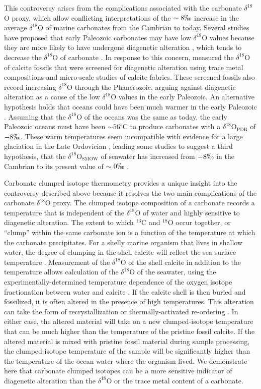 \documentclass{article}
\newcommand{\deltao}{$\delta^{18}$}
\newcommand{\degrees}{$^{\circ}$}
\begin{document}
This controversy arises from the complications associated with the carbonate \deltao O proxy, which allow conflicting interpretations of the $\sim 8\permil$ increase in the average \deltao O of marine carbonates from the Cambrian to today. Several studies have proposed that early Paleozoic carbonates may have low \deltao O values because they are more likely to have undergone diagenetic alteration \citep{Clayton1959,Keith1964,Land1995}, which tends to decrease the \deltao O of carbonate \citep{Marshall1992}. In response to this concern, \cite{Veizer1999} measured the \deltao O of calcite fossils that were screened for diagenetic alteration using trace metal compositions and micro-scale studies of calcite fabrics. These screened fossils also record increasing \deltao O through the Phanerozoic, arguing against diagenetic alteration as a cause of the low \deltao O values in the early Paleozoic. An alternative hypothesis holds that oceans could have been much warmer in the early Paleozoic \citep{Karhu1986,Knauth1976}. Assuming that the \deltao O of the oceans was the same as today, the early Paleozoic oceans must have been $\sim 56$\degrees C to produce carbonates with a \deltao O$_{\text{PDB}}$ of $-8\permil$. These warm temperatures seem incompatible with evidence for a large glaciation in the Late Ordovician \citep{Veizer1986}, leading some studies to suggest a third hypothesis, that the \deltao O$_{\text{SMOW}}$ of seawater has increased from $-8\permil$ in the Cambrian to its present value of $\sim 0\permil$ \citep{Jaffres2007,Veizer1999}. 

Carbonate clumped isotope thermometry provides a unique insight into the controversy described above because it resolves the two main complications of the carbonate \deltao O proxy. The clumped isotope composition of a carbonate records a temperature that is independent of the \deltao O of water and highly sensitive to diagenetic alteration. The extent to which $^{13}$C and $^{18}$O occur together, or ``clump'' within the same carbonate ion is a function of the temperature at which the carbonate precipitates. For a shelly marine organism that lives in shallow water, the degree of clumping in the shell calcite will reflect the sea surface temperature \citep{Ghosh2006}. Measurement of the \deltao O of the shell calcite in addition to the temperature allows calculation of the \deltao O of the seawater, using the experimentally-determined temperature dependence of the oxygen isotope fractionation between water and calcite \citep{Kim1997}. If the calcite shell is then buried and fossilized, it is often altered in the presence of high temperatures. This alteration can take the form of recrystallization or thermally-activated re-ordering \citep{Eiler2011}. In either case, the altered material will take on a new clumped-isotope temperature that can be much higher than the temperature of the pristine fossil calcite. If the altered material is mixed with pristine fossil material during sample processing, the clumped isotope temperature of the sample will be significantly higher than the temperature of the ocean water where the organism lived. We demonstrate here that carbonate clumped isotopes can be a more sensitive indicator of diagenetic alteration than the \deltao O or the trace metal content of a carbonate. 
\end{document}
